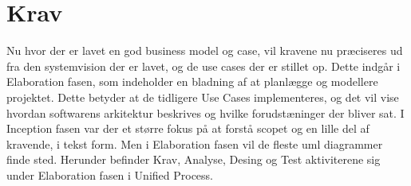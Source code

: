 \chapter{Krav}\label{ch:krav}
Nu hvor der er lavet en god business model og case, vil kravene nu præciseres ud fra den systemvision der er lavet, og de use cases der er stillet op. Dette indgår i Elaboration fasen, som indeholder en bladning af at planlægge og modellere projektet. Dette betyder at de tidligere Use Cases implementeres, og det vil vise hvordan softwarens arkitektur beskrives og hvilke forudstæninger der bliver sat. I Inception fasen var der et større fokus på at forstå scopet og en lille del af kravende, i tekst form. Men i Elaboration fasen vil de fleste uml diagrammer finde sted\cite{Larman2004}. Herunder befinder Krav, Analyse, Desing og Test aktiviterene sig under Elaboration fasen i Unified Process\cite{UnifiedProcess}. 



 